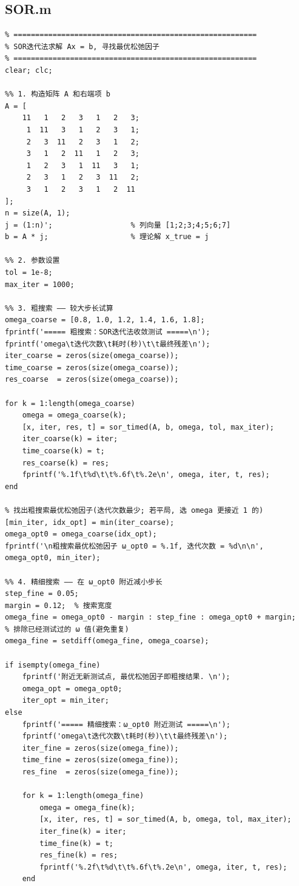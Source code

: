 \documentclass[12pt,a4paper]{ctexart}
\begin{document}
\subsection{SOR.m}\label{code:SOR}
\begin{lstlisting}
% ========================================================
% SOR迭代法求解 Ax = b, 寻找最优松弛因子
% ========================================================
clear; clc;

%% 1. 构造矩阵 A 和右端项 b
A = [
    11   1   2   3   1   2   3;
     1  11   3   1   2   3   1;
     2   3  11   2   3   1   2;
     3   1   2  11   1   2   3;
     1   2   3   1  11   3   1;
     2   3   1   2   3  11   2;
     3   1   2   3   1   2  11
];
n = size(A, 1);
j = (1:n)';                  % 列向量 [1;2;3;4;5;6;7]
b = A * j;                   % 理论解 x_true = j

%% 2. 参数设置
tol = 1e-8;
max_iter = 1000;

%% 3. 粗搜索 —— 较大步长试算
omega_coarse = [0.8, 1.0, 1.2, 1.4, 1.6, 1.8];
fprintf('===== 粗搜索：SOR迭代法收敛测试 =====\n');
fprintf('omega\t迭代次数\t耗时(秒)\t\t最终残差\n');
iter_coarse = zeros(size(omega_coarse));
time_coarse = zeros(size(omega_coarse));
res_coarse  = zeros(size(omega_coarse));

for k = 1:length(omega_coarse)
    omega = omega_coarse(k);
    [x, iter, res, t] = sor_timed(A, b, omega, tol, max_iter);
    iter_coarse(k) = iter;
    time_coarse(k) = t;
    res_coarse(k) = res;
    fprintf('%.1f\t%d\t\t%.6f\t%.2e\n', omega, iter, t, res);
end

% 找出粗搜索最优松弛因子(迭代次数最少; 若平局, 选 omega 更接近 1 的)
[min_iter, idx_opt] = min(iter_coarse);
omega_opt0 = omega_coarse(idx_opt);
fprintf('\n粗搜索最优松弛因子 ω_opt0 = %.1f, 迭代次数 = %d\n\n', omega_opt0, min_iter);

%% 4. 精细搜索 —— 在 ω_opt0 附近减小步长
step_fine = 0.05;
margin = 0.12;  % 搜索宽度
omega_fine = omega_opt0 - margin : step_fine : omega_opt0 + margin;
% 排除已经测试过的 ω 值(避免重复)
omega_fine = setdiff(omega_fine, omega_coarse);

if isempty(omega_fine)
    fprintf('附近无新测试点, 最优松弛因子即粗搜结果. \n');
    omega_opt = omega_opt0;
    iter_opt = min_iter;
else
    fprintf('===== 精细搜索：ω_opt0 附近测试 =====\n');
    fprintf('omega\t迭代次数\t耗时(秒)\t\t最终残差\n');
    iter_fine = zeros(size(omega_fine));
    time_fine = zeros(size(omega_fine));
    res_fine  = zeros(size(omega_fine));

    for k = 1:length(omega_fine)
        omega = omega_fine(k);
        [x, iter, res, t] = sor_timed(A, b, omega, tol, max_iter);
        iter_fine(k) = iter;
        time_fine(k) = t;
        res_fine(k) = res;
        fprintf('%.2f\t%d\t\t%.6f\t%.2e\n', omega, iter, t, res);
    end


\end{lstlisting}
\end{document}
